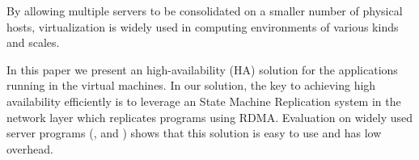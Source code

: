 By allowing multiple servers to be consolidated on a smaller number of physical 
hosts, virtualization is widely used in computing environments of various kinds and
scales.

In this paper we present an high-availability (HA) solution for the applications running in 
the virtual machines. In our solution, the key to achieving high availability efficiently 
is to leverage an State Machine Replication system in the network layer which 
replicates programs using RDMA. Evaluation on \nprog widely used server programs (\eg, \mysql and 
\redis) shows that this solution is easy to use and has low overhead.
